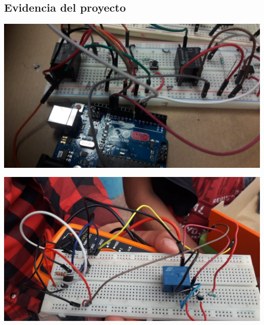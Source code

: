 \documentclass[12pt,a4paper]{article}
\begin{document}
\subsection{Evidencia del proyecto}
\begin{flushleft}
\includegraphics[width=15cm]{1.jpeg} 
\end{flushleft}
\begin{flushleft}
\includegraphics[width=15cm]{2.jpeg} 
\end{flushleft}
\end{document}
